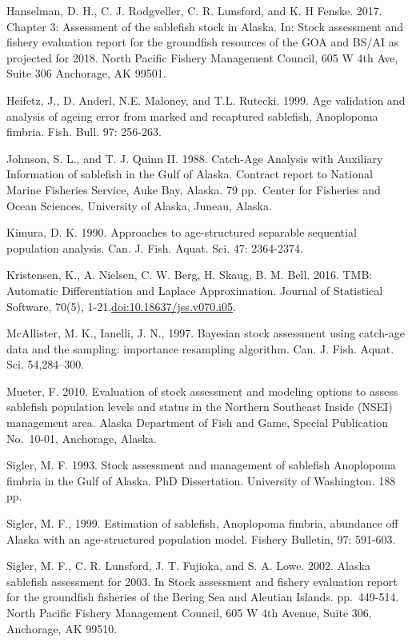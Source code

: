 \documentclass[
]{article}
\begin{document}
Hanselman, D. H., C. J. Rodgveller, C. R. Lunsford, and K. H Fenske.
2017. Chapter 3: Assessment of the sablefish stock in Alaska. In: Stock
assessment and fishery evaluation report for the groundfish resources of
the GOA and BS/AI as projected for 2018. North Pacific Fishery
Management Council, 605 W 4th Ave, Suite 306 Anchorage, AK 99501.

Heifetz, J., D. Anderl, N.E. Maloney, and T.L. Rutecki. 1999. Age
validation and analysis of ageing error from marked and recaptured
sablefish, Anoplopoma fimbria. Fish. Bull. 97: 256-263.

Johnson, S. L., and T. J. Quinn II. 1988. Catch-Age Analysis with
Auxiliary Information of sablefish in the Gulf of Alaska. Contract
report to National Marine Fisheries Service, Auke Bay, Alaska. 79
pp.~Center for Fisheries and Ocean Sciences, University of Alaska,
Juneau, Alaska.

Kimura, D. K. 1990. Approaches to age-structured separable sequential
population analysis. Can. J. Fish. Aquat. Sci. 47: 2364-2374.

Kristensen, K., A. Nielsen, C. W. Berg, H. Skaug, B. M. Bell. 2016. TMB:
Automatic Differentiation and Laplace Approximation. Journal of
Statistical Software, 70(5), 1-21.\url{doi:10.18637/jss.v070.i05}.

McAllister, M. K., Ianelli, J. N., 1997. Bayesian stock assessment using
catch-age data and the sampling: importance resampling algorithm. Can.
J. Fish. Aquat. Sci. 54,284--300.

Mueter, F. 2010. Evaluation of stock assessment and modeling options to
assess sablefish population levels and status in the Northern Southeast
Inside (NSEI) management area. Alaska Department of Fish and Game,
Special Publication No.~10-01, Anchorage, Alaska.

Sigler, M. F. 1993. Stock assessment and management of sablefish
Anoplopoma fimbria in the Gulf of Alaska. PhD Dissertation. University
of Washington. 188 pp.

Sigler, M. F., 1999. Estimation of sablefish, Anoplopoma fimbria,
abundance off Alaska with an age-structured population model. Fishery
Bulletin, 97: 591-603.

Sigler, M. F., C. R. Lunsford, J. T. Fujioka, and S. A. Lowe. 2002.
Alaska sablefish assessment for 2003. In Stock assessment and fishery
evaluation report for the groundfish fisheries of the Bering Sea and
Aleutian Islands. pp.~449-514. North Pacific Fishery Management Council,
605 W 4th Avenue, Suite 306, Anchorage, AK 99510.
\end{document}
